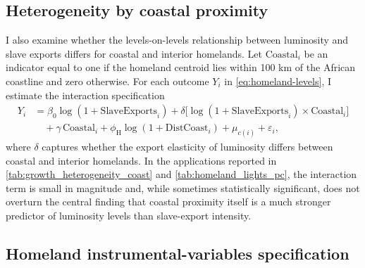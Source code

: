 \documentclass[12pt]{article}
\begin{document}
\subsection*{Heterogeneity by coastal proximity}

I also examine whether the levels-on-levels relationship between luminosity and slave exports differs for coastal and interior homelands. Let $\text{Coastal}_i$ be an indicator equal to one if the homeland centroid lies within 100 km of the African coastline and zero otherwise. For each outcome $Y_i$ in \eqref{eq:homeland-levels}, I estimate the interaction specification
\begin{equation}
\begin{aligned}
Y_i
&=
\beta_{0} \log\!\left(1+\text{SlaveExports}_i\right)
+ \delta \bigl[\log\!\left(1+\text{SlaveExports}_i\right)\times \text{Coastal}_i\bigr] \\
&\quad
+ \gamma\,\text{Coastal}_i
+ \phi_{\text{H}} \log\!\left(1+\text{DistCoast}_i\right)
+ \mu_{c(i)} + \varepsilon_i,
\end{aligned}
\label{eq:homeland-coast-het-levels}
\end{equation}
where $\delta$ captures whether the export elasticity of luminosity differs between coastal and interior homelands. In the applications reported in \autoref{tab:growth_heterogeneity_coast} and \autoref{tab:homeland_lights_pc}, the interaction term is small in magnitude and, while sometimes statistically significant, does not overturn the central finding that coastal proximity itself is a much stronger predictor of luminosity levels than slave-export intensity.

\subsection*{Homeland instrumental-variables specification}
\end{document}
